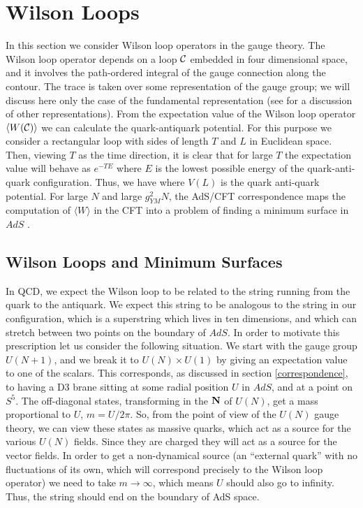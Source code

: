 
\section{Wilson Loops}
\label{wilsonloops}


In this section we consider Wilson loop operators in the
gauge theory. 
The Wilson loop operator 
 depends on a loop ${\cal
C}$ embedded in four dimensional space, and it involves the
path-ordered integral of the gauge connection along the contour. The
trace is taken over some representation of the gauge group; we will
discuss here only the case of the fundamental representation (see
\cite{Gross:1998gk} for a discussion of other representations).  From
the expectation value of the Wilson loop operator $\langle W({\cal C})
\rangle $ we can calculate the quark-antiquark potential. For this
purpose we consider a rectangular loop with sides of length $T$ and
$L$ in Euclidean space.  Then, viewing $T$ as the time direction, it
is clear that for large $T$ the expectation value will behave as
$e^{-TE}$ where $E$ is the lowest possible energy of the
quark-anti-quark configuration. Thus, we have
where $V(L)$ is the quark anti-quark potential. For large $N$ and 
large $g_{YM}^2 N$, the AdS/CFT
correspondence maps the computation of $\langle W \rangle$ in the CFT
into a problem of finding a minimum surface in $AdS$ 
\cite{Maldacena:1998im,Rey:1998ik}. 

\subsection{Wilson Loops and Minimum Surfaces}
 
In QCD, we expect the Wilson loop to be related to the string running
from the quark to the antiquark.
We expect this string to be analogous to the string in our configuration,
which is a superstring
which lives in ten dimensions, and which can stretch between two 
points on the boundary of $AdS$.  In order to motivate this
prescription let us consider the following situation. We start with
the gauge group $U(N+1)$, and we break it to $U(N)\times U(1)$ by
giving an expectation value to one of the scalars. This corresponds,
as discussed in section \ref{correspondence}, to having a D3 brane
sitting at some radial position $U$ in $AdS$, and
at a point on $S^5$.  The off-diagonal states, transforming in the
${\bf N}$ of $U(N)$, get a mass proportional to $U$, $m 
= U / 2 \pi$.  So, from the point of view of the $U(N)$ gauge
theory, we can view these states as massive quarks, which act as a source
for the various $U(N) $ fields. Since they are charged they will act as a
source for the vector fields. In order to get a non-dynamical source
(an ``external quark'' with no fluctuations of its own, which will
correspond precisely to the Wilson loop operator) we need to take $m \to
\infty$, which means $U$ should also go to infinity. Thus, the string
should end on the boundary of AdS space.


